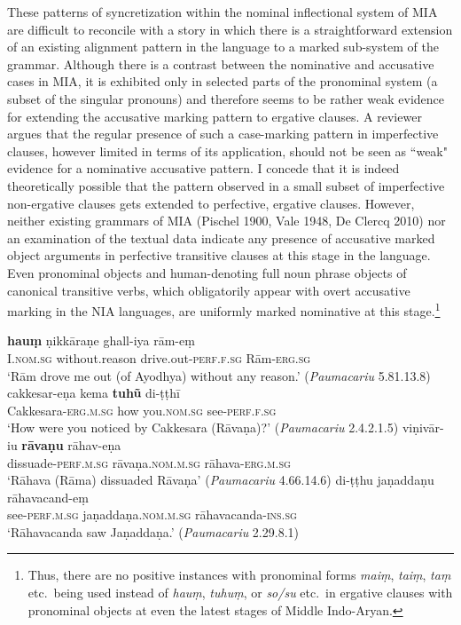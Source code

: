 \documentclass[output=paper,
modfonts
]{LSP/langsci}
\begin{document}
These patterns of syncretization within the nominal inflectional system of MIA  
are difficult to reconcile with a story in which there is a straightforward extension of an existing alignment pattern in the language to a marked sub-system of the grammar. 
Although there is a   contrast between the nominative and accusative cases in MIA, it is exhibited only  in selected parts of the pronominal system (a subset of the singular pronouns) and therefore seems to be rather weak evidence for extending the accusative marking pattern to ergative clauses. A reviewer argues that the regular presence of such a case-marking pattern in imperfective clauses, however limited in terms of its application,  should not be seen as ``weak" evidence for a nominative accusative pattern.  I concede  that it is indeed theoretically possible that the pattern observed in a small  subset of imperfective non-ergative clauses gets extended to  perfective, ergative clauses. However,
neither existing grammars of MIA (Pischel 1900, Vale 1948, De Clercq 2010) nor an examination of the textual data indicate  any  presence of accusative marked object arguments in perfective transitive clauses at this stage in the language. Even  pronominal objects  and human-denoting full noun phrase objects  of canonical transitive verbs, which obligatorily appear with overt accusative marking in the NIA languages,  are uniformly marked nominative at this stage.\footnote{Thus, there are no positive  instances with pronominal forms  \textit{maiṃ}, \textit{taiṃ},  \textit{taṃ} etc.\ being used instead of \textit{hauṃ}, \textit{tuhuṃ}, or \textit{so/su} etc.\  in ergative clauses with pronominal objects at even the latest stages of Middle Indo-Aryan.} 

\begin{exe}
\ex\label{ex:yza}
\begin{xlist}
\ex\label{ex:haum}\gll \textbf{hauṃ} ṇikkāraṇe ghall-iya  rām-eṃ \\
I.\textsc{nom.sg} without.reason drive.out-\textsc{perf.f.sg} Rām-\textsc{erg.sg} \\
\glt `Rām drove me out (of Ayodhya) without any reason.' (\textit{Paumacariu} 5.81.13.8) 
\ex\label{ex:cakkesarena}\gll cakkesar-eṇa kema \textbf{tuhũ} di-ṭṭhī \\ Cakkesara-\textsc{erg.m.sg} how you.\textsc{nom.sg} see-\textsc{perf.f.sg} \\
\glt `How were you noticed by Cakkesara (Rāvaṇa)?' (\textit{Paumacariu} 2.4.2.1.5) 
\ex\label{ex:vinivariu}\gll viṇivār-iu \textbf{rāvaṇu} rāhav-eṇa \\ dissuade-\textsc{perf.m.sg} rāvaṇa.\textsc{nom.m.sg}  rāhava-\textsc{erg.m.sg} \\
\glt `Rāhava (Rāma)  dissuaded Rāvaṇa' (\textit{Paumacariu} 4.66.14.6)
\ex\label{ex:ditthu}\gll di-ṭṭhu jaṇaddaṇu rāhavacand-eṃ \\
see-\textsc{perf.m.sg} jaṇaddaṇa.\textsc{nom.m.sg} rāhavacanda-\textsc{ins.sg} \\
\glt `Rāhavacanda saw Jaṇaddaṇa.' (\textit{Paumacariu} 2.29.8.1)
\end{xlist}
\end{exe}
\end{document}
